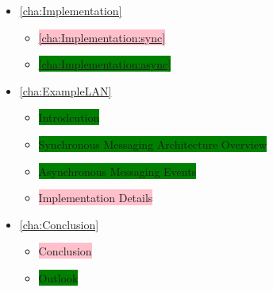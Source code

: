 \begin{itemize}
\begin{itemize}
	      \end{itemize}
	\item \ref{cha:Implementation} 
	      \begin{itemize}
		      \item \colorbox{pink}{\ref{cha:Implementation:sync} }
		      \item \colorbox{green}{\ref{cha:Implementation:async} }
	      \end{itemize}
	\item \ref{cha:ExampleLAN} 
	      \begin{itemize}
		      \item \colorbox{green}{Introdcution}
		      \item \colorbox{green}{Synchronous Messaging Architecture Overview}
		      \item \colorbox{green}{Asynchronous Messaging Events}
		      \item \colorbox{pink}{Implementation Details}
	      \end{itemize}
	\item \ref{cha:Conclusion} 
	      \begin{itemize}
		      \item \colorbox{pink}{Conclusion}
		      \item \colorbox{green}{Outlook}
	      \end{itemize}
\end{itemize}